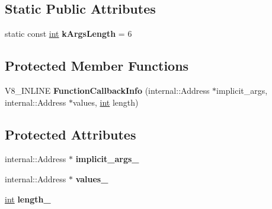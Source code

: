 \subsection*{Static Public Attributes}
\begin{DoxyCompactItemize}
\item 
\mbox{\label{classv8_1_1FunctionCallbackInfo_a1e5248c2d40840270829882feaaa9d34}} 
static const \mbox{\hyperlink{classint}{int}} {\bfseries k\+Args\+Length} = 6
\end{DoxyCompactItemize}
\subsection*{Protected Member Functions}
\begin{DoxyCompactItemize}
\item 
\mbox{\label{classv8_1_1FunctionCallbackInfo_a34ca4a2f13fa2479a340d5cfd8efaca1}} 
V8\+\_\+\+I\+N\+L\+I\+NE {\bfseries Function\+Callback\+Info} (internal\+::\+Address $\ast$implicit\+\_\+args, internal\+::\+Address $\ast$values, \mbox{\hyperlink{classint}{int}} length)
\end{DoxyCompactItemize}
\subsection*{Protected Attributes}
\begin{DoxyCompactItemize}
\item 
\mbox{\label{classv8_1_1FunctionCallbackInfo_a589fda1e686768fb49af5f5ea9e6549e}} 
internal\+::\+Address $\ast$ {\bfseries implicit\+\_\+args\+\_\+}
\item 
\mbox{\label{classv8_1_1FunctionCallbackInfo_a1692383567930ec69c51ddfd9207744e}} 
internal\+::\+Address $\ast$ {\bfseries values\+\_\+}
\item 
\mbox{\label{classv8_1_1FunctionCallbackInfo_ab250ace06b495beb6f14b192eff77005}} 
\mbox{\hyperlink{classint}{int}} {\bfseries length\+\_\+}
\end{DoxyCompactItemize}
